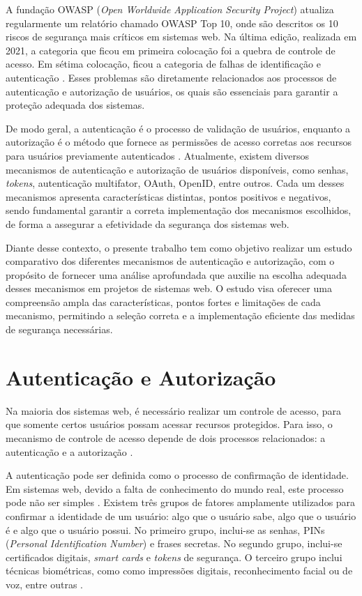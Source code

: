 \documentclass[12pt]{article}
\begin{document}
A fundação OWASP (\emph{Open Worldwide Application Security Project}) atualiza
regularmente um relatório chamado OWASP Top 10, onde são descritos os 10 riscos
de segurança mais críticos em sistemas web. Na última edição, realizada em 2021, a
categoria que ficou em primeira colocação foi a quebra de controle de acesso. Em
sétima colocação, ficou a categoria de falhas de identificação e autenticação 
\cite{OWASP2021}. Esses problemas são diretamente relacionados aos processos de 
autenticação e autorização de usuários, os quais são essenciais para garantir a 
proteção adequada dos sistemas.

De modo geral, a autenticação é o processo de validação de usuários, enquanto a 
autorização é o método que fornece as permissões de acesso corretas aos recursos 
para usuários previamente autenticados \cite{TUMIN2012}. Atualmente, existem diversos 
mecanismos de autenticação e autorização de usuários disponíveis, como senhas, \emph{tokens}, 
autenticação multifator, OAuth, OpenID, entre outros. Cada um desses mecanismos 
apresenta características distintas, pontos positivos e negativos, sendo fundamental 
garantir a correta implementação dos mecanismos escolhidos, de forma a assegurar a 
efetividade da segurança dos sistemas web. 

Diante desse contexto, o presente trabalho tem como objetivo realizar um estudo 
comparativo dos diferentes mecanismos de autenticação e autorização, com o propósito 
de fornecer uma análise aprofundada que auxilie na escolha adequada desses mecanismos 
em projetos de sistemas web. O estudo visa oferecer uma compreensão ampla das 
características, pontos fortes e limitações de cada mecanismo, permitindo a seleção 
correta e a implementação eficiente das medidas de segurança necessárias.

\section{Autenticação e Autorização}

Na maioria dos sistemas web, é necessário realizar um controle de acesso, para que somente
certos usuários possam acessar recursos protegidos. Para isso, o mecanismo  de controle de 
acesso depende de dois processos relacionados: a autenticação e a autorização 
\cite{SULLIVAN2011}.

A autenticação pode ser definida como o processo de confirmação de identidade. Em sistemas web,
devido a falta de conhecimento do mundo real, este processo pode não ser simples 
\cite{CHAPMAN2012}. Existem três grupos de fatores amplamente utilizados para confirmar a 
identidade de um usuário: algo que o usuário sabe, algo que o usuário é e algo que o usuário 
possui. No primeiro grupo, inclui-se as senhas, PINs (\emph{Personal Identification Number}) e 
frases secretas. No segundo grupo, inclui-se certificados digitais, \emph{smart cards} e 
\emph{tokens} de segurança. O terceiro grupo inclui técnicas biométricas, como como impressões 
digitais, reconhecimento facial ou de voz, entre outras \cite{SULLIVAN2011}.
\end{document}
